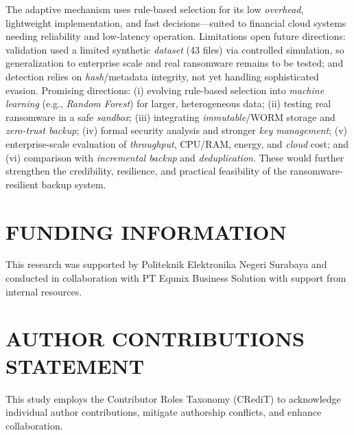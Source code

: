 \documentclass{iaesarticle}
\begin{document}
The adaptive mechanism uses rule-based selection for its low \textit{overhead}, lightweight implementation, and fast decisions---suited to financial cloud systems needing reliability and low-latency operation. Limitations open future directions: validation used a limited synthetic \textit{dataset} (43 files) via controlled simulation, so generalization to enterprise scale and real ransomware remains to be tested; and detection relies on \textit{hash}/metadata integrity, not yet handling sophisticated evasion. Promising directions: (i) evolving rule-based selection into \textit{machine learning} (e.g., \textit{Random Forest}) for larger, heterogeneous data; (ii) testing real ransomware in a safe \textit{sandbox}; (iii) integrating \textit{immutable}/WORM storage and \textit{zero-trust backup}; (iv) formal security analysis and stronger \textit{key management}; (v) enterprise-scale evaluation of \textit{throughput}, CPU/RAM, energy, and \textit{cloud} cost; and (vi) comparison with \textit{incremental backup} and \textit{deduplication}. These would further strengthen the credibility, resilience, and practical feasibility of the ransomware-resilient backup system.

\section*{FUNDING INFORMATION}
\label{sec:funding}
This research was supported by Politeknik Elektronika Negeri Surabaya and conducted in collaboration with PT Equnix Business Solution with support from internal resources.

\section*{AUTHOR CONTRIBUTIONS STATEMENT}
\label{sec:credit}
This study employs the Contributor Roles Taxonomy (CRediT) to acknowledge individual author contributions, mitigate authorship conflicts, and enhance collaboration.
\end{document}
